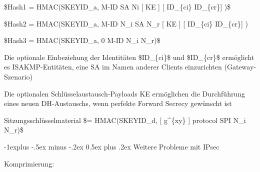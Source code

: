 \documentclass[a4paper]{article}
\makeatletter
\renewcommand{\subsection}{\@startsection{subsection}{2}{0mm}%
 {-1explus -.5ex minus -.2ex}%
 {0.5ex plus .2ex}%
 {\normalfont\normalsize\bfseries}}
\makeatother
\begin{document}
\begin{multicols}{3}
\begin{itemize*}
            \begin{itemize*}
                  \item
                  \$Hash1 = HMAC(SKEYID\_a, M-ID \textbar{} SA \textbar{} Ni \textbar{}
                  {[} \textbar{} KE {]} {[} \textbar{} ID\_\{ci\} \textbar{}
                  ID\_\{cr\}{]} )\$
                  \item
                  \$Hash2 = HMAC(SKEYID\_a, M-ID \textbar{} N\_i \textbar{} SA
                  \textbar{} N\_r \textbar{} {[} \textbar{} KE {]} {[} \textbar{}
                  ID\_\{ci\} \textbar{} ID\_\{cr\}{]} )
                  \item
                  \$Hash3 = HMAC(SKEYID\_a, 0 \textbar{} M-ID \textbar{} N\_i \textbar{}
                  N\_r)\$
                  \item
                  Die optionale Einbeziehung der Identitäten \$ID\_\{ci\}\$ und
                  \$ID\_\{cr\}\$ ermöglicht es ISAKMP-Entitäten, eine SA im Namen
                  anderer Clients einzurichten (Gateway-Szenario)
                  \item
                  Die optionalen Schlüsselaustausch-Payloads KE ermöglichen die
                  Durchführung eines neuen DH-Austauschs, wenn perfekte Forward Secrecy
                  gewünscht ist
                  \item
                  Sitzungsschlüsselmaterial \$= HMAC(SKEYID\_d, {[} g\^{}\{xy\}
                  \textbar{} {]} protocol \textbar{} SPI \textbar{} N\_i \textbar{}
                  N\_r)\$
            \end{itemize*}


            \subsection{Weitere Probleme mit
                  IPsec}

            \begin{itemize*}
                  \item
                  Komprimierung:


\end{itemize*}
\end{itemize*}
\end{multicols}
\end{document}
